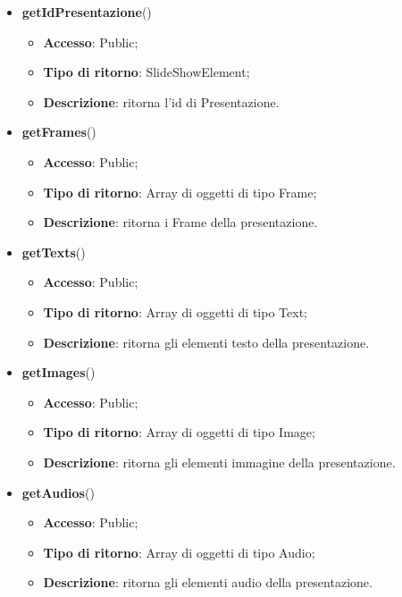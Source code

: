 {\begin{itemize}
\begin{itemize}
				\item \textbf{Tipo di ritorno}: SlideShowElement;
				\item \textbf{Descrizione}: ritorna il nome di Presentazione.
			\end{itemize}
			\item \textbf{getIdPresentazione}()
			\begin{itemize}
				\item \textbf{Accesso}: Public;
				\item \textbf{Tipo di ritorno}: SlideShowElement;
				\item \textbf{Descrizione}: ritorna l'id di Presentazione. 
			\end{itemize}
			\item \textbf{getFrames}()
			\begin{itemize}
				\item \textbf{Accesso}: Public;
				\item \textbf{Tipo di ritorno}: Array di oggetti di tipo Frame;
				\item \textbf{Descrizione}: ritorna i Frame della presentazione.
			\end{itemize}
			\item \textbf{getTexts}()
			\begin{itemize}
				\item \textbf{Accesso}: Public;
				\item \textbf{Tipo di ritorno}: Array di oggetti di tipo Text;
				\item \textbf{Descrizione}: ritorna gli elementi testo della presentazione.
			\end{itemize}
			\item \textbf{getImages}()
			\begin{itemize}
				\item \textbf{Accesso}: Public;
				\item \textbf{Tipo di ritorno}: Array di oggetti di tipo Image;
				\item \textbf{Descrizione}: ritorna gli elementi immagine della presentazione.
			\end{itemize}
			\item \textbf{getAudios}()
			\begin{itemize}
				\item \textbf{Accesso}: Public;
				\item \textbf{Tipo di ritorno}: Array di oggetti di tipo Audio;
				\item \textbf{Descrizione}: ritorna gli elementi audio della presentazione.

\end{itemize}
\end{itemize}}
